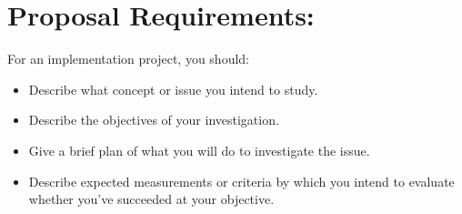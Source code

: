 \documentclass[12pt]{article}
\begin{document}
	
	
	\pagebreak %
	
	\tableofcontents
	
	\pagebreak
	
    \section{Proposal Requirements:}
    For an implementation project, you should:
    \begin{itemize}
        \item Describe what concept or issue you intend to study. 
        \item Describe the objectives of your investigation. 
        \item Give a brief plan of what you will do to investigate the issue. 
        \item Describe expected measurements or criteria by which you intend to
            evaluate whether you've succeeded at your objective.
    \end{itemize}
\end{document}
